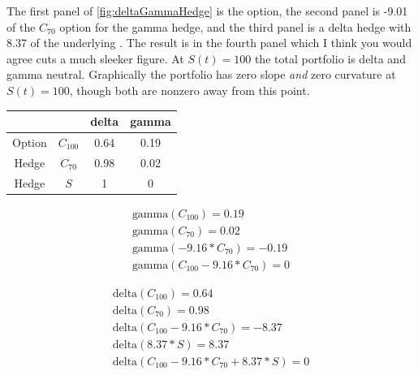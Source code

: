 The first panel of \ref{fig:deltaGammaHedge}  is the option, the second panel is -9.01 of the $C_{70}$ option for the gamma hedge, and the third panel is a delta hedge with 8.37 of the underlying . The result is in the fourth panel which I think you would agree cuts a much sleeker figure.  At $S(t)=100$ the total portfolio is delta and gamma neutral. Graphically the portfolio has zero slope \textit{and} zero curvature at $S(t)=100$, though both are nonzero away from this point.

\begin{center}
\begin{tabular}{|c|ccc|}
\hline
 & & delta & gamma\\
\hline
Option & $C_{100}$ & 0.64 & 0.19\\
Hedge & $C_{70}$ & 0.98 & 0.02\\
Hedge & $S$ & 1 & 0\\
\hline
\end{tabular}
\end{center}

\begin{eqnarray*}
\mbox{gamma}(C_{100}) = 0.19\\
\mbox{gamma}(C_{70}) = 0.02\\
\mbox{gamma}(-9.16*C_{70}) = -0.19\\
\mbox{gamma}(C_{100}-9.16*C_{70}) = 0
\end{eqnarray*}

\begin{eqnarray*}
\mbox{delta}(C_{100}) = 0.64\\
\mbox{delta}(C_{70}) = 0.98\\
\mbox{delta}(C_{100} -9.16*C_{70}) = -8.37\\
\mbox{delta}(8.37*S) = 8.37\\
\mbox{delta}(C_{100} -9.16*C_{70}+8.37*S) = 0
\end{eqnarray*}

